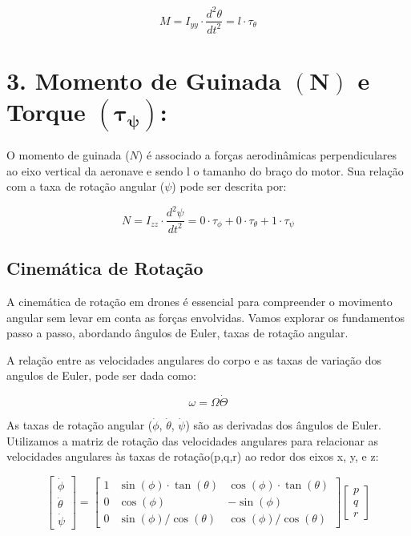 \[
	M = I_{yy} \cdot \frac{d^2 \theta}{dt^2} = l \cdot \tau_{\theta}
\]

\section*{3. Momento de Guinada $(\boldsymbol{N})$ e Torque $(\boldsymbol{\tau_{\psi}})$:}

O momento de guinada (\(N\)) é associado a forças aerodinâmicas perpendiculares ao eixo vertical da aeronave e sendo l o tamanho do braço do motor. Sua relação com a taxa de rotação angular (\(\psi\)) pode ser descrita por:

\[
	N = I_{zz} \cdot \frac{d^2 \psi}{dt^2} = 0 \cdot \tau_{\phi} + 0 \cdot \tau_{\theta} + 1 \cdot \tau_{\psi}
\]


\subsection{Cinemática de Rotação}

A cinemática de rotação em drones é essencial para compreender o movimento angular sem levar em conta as forças envolvidas. Vamos explorar os fundamentos passo a passo, abordando ângulos de Euler, taxas de rotação angular.

A relação entre as velocidades angulares do corpo e as taxas de variação dos angulos de Euler, pode ser dada como:

\begin{equation}
	\omega = \Omega \dot{\Theta}
\end{equation}

As taxas de rotação angular ($\dot{\phi}$, $\dot{\theta}$, $\dot{\psi}$) são as derivadas dos ângulos de Euler. Utilizamos a matriz de rotação das velocidades angulares para relacionar as velocidades angulares às taxas de rotação(p,q,r) ao redor dos eixos x, y, e z:

\[
	\begin{bmatrix}
		\dot{\phi}   \\
		\dot{\theta} \\
		\dot{\psi}
	\end{bmatrix}
	=
	\begin{bmatrix}
		1 & \sin(\phi) \cdot \tan(\theta) & \cos(\phi) \cdot \tan(\theta) \\
		0 & \cos(\phi)                    & -\sin(\phi)                   \\
		0 & \sin(\phi)/\cos(\theta)       & \cos(\phi)/\cos(\theta)
	\end{bmatrix}
	\begin{bmatrix}
		p \\
		q \\
		r
	\end{bmatrix}
\]

